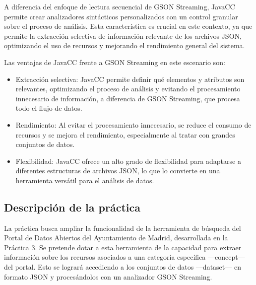 
 \noindent A diferencia del enfoque de lectura secuencial de GSON Streaming, JavaCC permite crear analizadores sintácticos personalizados con un control granular sobre el proceso de análisis. Esta característica es crucial en este contexto, ya que permite la extracción selectiva de información relevante de los archivos JSON, optimizando el uso de recursos y mejorando el rendimiento general del sistema.

Las ventajas de JavaCC frente a GSON Streaming en este escenario son:

\begin{itemize}
  \item Extracción selectiva: JavaCC permite definir qué elementos y atributos son relevantes, optimizando el proceso de análisis y evitando el procesamiento innecesario de información, a diferencia de GSON Streaming, que procesa todo el flujo de datos.
  
  \item Rendimiento: Al evitar el procesamiento innecesario, se reduce el consumo de recursos y se mejora el rendimiento, especialmente al tratar con grandes conjuntos de datos.
  
  \item Flexibilidad: JavaCC ofrece un alto grado de flexibilidad para adaptarse a diferentes estructuras de archivos JSON, lo que lo convierte en una herramienta versátil para el análisis de datos.
\end{itemize}


\subsection{Descripción de la práctica}

\noindent La práctica busca ampliar la funcionalidad de la herramienta de búsqueda del Portal de Datos Abiertos del Ayuntamiento de Madrid, desarrollada en la Práctica 3. Se pretende dotar a esta herramienta de la capacidad para extraer información sobre los recursos asociados a una categoría específica ---concept--- del portal. Esto se logrará accediendo a los conjuntos de datos ---dataset--- en formato JSON y procesándolos con un analizador GSON Streaming.

